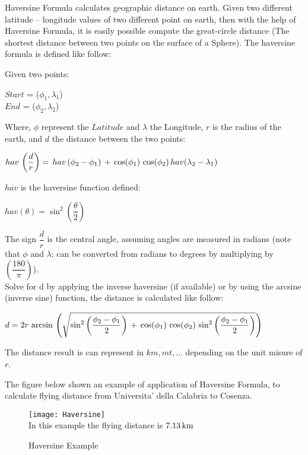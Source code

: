 \documentclass[tesi]{subfiles}
\begin{document}
\noindent Haversine Formula calculates geographic distance on earth. Given two different latitude – longitude values of two different point on earth, then with the help of Haversine Formula, it is easily possible compute the great-circle distance (The shortest distance between two points on the surface of a Sphere). 		
\noindent The haversine formula is defined like follow:

\noindent Given two points:
\begin{center}
$Start$ = ($\phi_{1} , \lambda_{1}$)\\
$End$ = ($\phi_{2} , \lambda_{2}$)
\end{center}

Where, $\phi$ represent the $Latitude$ and $\lambda$ the Longitude, $r$ is the radius of the earth, and $d$ the distance between the two points:\\

\begin{center}

$ hav \thinspace \left(\dfrac{d}{r}\right) = \thinspace hav \thinspace (\phi_{2} - \phi_{1}) \thinspace + \thinspace \cos (\phi_{1}) \thinspace \cos(\phi_{2}) \thinspace hav(\lambda_{2} - \lambda_{1})$
\end{center}

\noindent $hav$ is the haversine function defined:

\begin{center}
$hav(\theta) = \sin^{2} \left(\dfrac{\theta}{2}\right)$
\end{center}

\noindent The sign $\dfrac{d}{r}$ is the central angle, assuming angles are measured in radians (note that $\phi$ and $\lambda$; can be converted from radians to degrees by multiplying by $\left(\dfrac{180}{\pi}\right)$).\\
Solve for d by applying the inverse haversine (if available) or by using the arcsine (inverse sine) function, the distance is calculated like follow:

\begin{center}
 $d = 2r \thinspace \arcsin \thinspace \left(\sqrt{\sin^{2} \left(\dfrac{\phi_{2} - \phi_{1}}{2}\right) \thinspace + \thinspace \cos (\phi_{1}) \thinspace \cos(\phi_{2}) \thinspace \sin^{2} \left(\dfrac{\phi_{2} - \phi_{1}}{2}\right) }\right) $
\end{center}


\noindent The distance result is can represent in $km, mt, ...$ depending on the unit misure of $r$.

\noindent The figure below shown an example of application of Haversine Formula, to calculate flying distance from Universita' della Calabria to Cosenza.



\begin{figure}[H]	
\centering
\texttt{[image: Haversine]} 
\\In this example the flying distance is $7.13 \thinspace \si{km}$
 \caption{Haversine Example}
  \label{fig:Haversine Example}
\end{figure}
\end{document}
